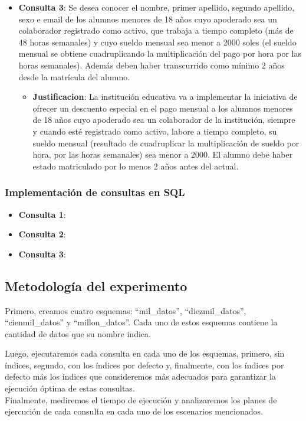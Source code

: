 \begin{itemize}
\begin{itemize}
          \end{itemize}
    \item{\textbf{Consulta 3}: Se desea conocer el nombre, primer apellido, segundo apellido, sexo e email de los alumnos menores de 18 años cuyo apoderado sea un colaborador registrado como activo, que trabaja a tiempo completo (más de 48 horas semanales) y cuyo sueldo mensual sea menor a 2000 soles (el sueldo mensual se obtiene cuadruplicando la multiplicación del pago por hora por las horas semanales). Además deben haber transcurrido como mínimo 2 años desde la matrícula del alumno.}
          \begin{itemize}
              \item{\textbf{Justificacion}: La institución educativa va a implementar la iniciativa de ofrecer un descuento especial en el pago mensual a los alumnos menores de 18 años cuyo apoderado sea un colaborador de la institución, siempre y cuando esté registrado como activo, labore a tiempo completo, su sueldo mensual (resultado de cuadruplicar la multiplicación de sueldo por hora, por las horas semanales) sea menor a 2000. El alumno debe haber estado matriculado por lo menos 2 años antes del actual.}
          \end{itemize}
\end{itemize}
\subsubsection{Implementación de consultas en SQL}
\begin{itemize}
    \item{\textbf{Consulta 1}:
          }
    \item{\textbf{Consulta 2}:
          }
    \item{\textbf{Consulta 3}:
          }
\end{itemize}
\subsection{Metodología del experimento}
\begin{sloppypar}
    Primero, creamos cuatro esquemas: ``mil\_datos'', ``diezmil\_datos'', ``cienmil\_datos'' y ``millon\_datos''. Cada uno de estos esquemas contiene la cantidad de datos que su nombre indica.
\end{sloppypar}

Luego, ejecutaremos cada consulta en cada uno de los esquemas, primero, sin índices, segundo, con los índices por defecto y, finalmente, con los índices por defecto más los índices que consideremos más adecuados para garantizar la ejecución óptima de estas consultas.\\
Finalmente, mediremos el tiempo de ejecución y analizaremos los planes de ejercución de cada consulta en cada uno de los escenarios mencionados.
